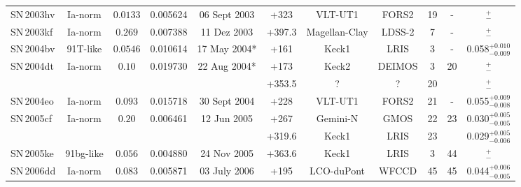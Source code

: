 \documentclass[fleqn,usenatbib]{mnras}
\begin{document}
\begin{table}
{\begin{tabular}{l c c cccccccc}
    SN\,2003hv & Ia-norm   & $0.0133$ & 0.005624 & 06 Sept 2003 & +323   & VLT-UT1  & FORS2         & 19&-& $^{+}_{-}$ \\
    SN\,2003kf & Ia-norm   & $0.269$  & 0.007388 & 11 Dez 2003  & +397.3 & Magellan-Clay & LDSS-2   & 7 & - & $^{+}_{-}$ \\
    SN\,2004bv & 91T-like  & $0.0546$ & 0.010614 & 17 May 2004* & +161   & Keck1    & LRIS          & 3 &-& 0.058$^{+0.010}_{-0.009}$ \\
    SN\,2004dt & Ia-norm   & $0.10$   & 0.019730 & 22 Aug 2004* & +173   & Keck2    & DEIMOS        & 3 &20& $^{+}_{-}$ \\
             &           &          &          &              & +353.5 &       ?  &  ?            & 20& & $^{+}_{-}$ \\
    SN\,2004eo & Ia-norm   & $0.093$  & 0.015718 & 30 Sept 2004 & +228   & VLT-UT1  & FORS2         & 21& - & 0.055$^{+0.009}_{-0.008}$ \\
    SN\,2005cf & Ia-norm   & $0.20$   & 0.006461 & 12 Jun 2005  & +267   & Gemini-N & GMOS          & 22& 23& 0.030$^{+0.005}_{-0.005}$ \\
             &           &          &          &              & +319.6 & Keck1    & LRIS          & 23&   & 0.029$^{+0.005}_{-0.006}$  \\
    SN\,2005ke & 91bg-like & $0.056$   & 0.004880 & 24 Nov 2005  & +363.6 & Keck1    & LRIS          & 3 & 44 & $^{+}_{-}$ \\
    SN\,2006dd & Ia-norm   & $0.083$   & 0.005871 & 03 July 2006 & +195   & LCO-duPont & WFCCD       & 45& 45 & 0.044$^{+0.006}_{-0.005}$ \\ 
        	\hline
    \end{tabular} }
\end{table}
\end{document}
